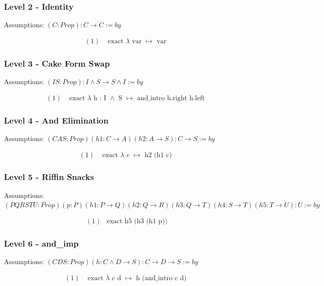 \documentclass{article}
\theoremstyle{theorem}
\theoremstyle{definition}
\theoremstyle{remark}
\begin{document}
\subsubsection*{Level 2 - Identity}
Assumptions: $(C: Prop) : C \rightarrow C := by$

\[
\begin{aligned}
  (1)& \text{ exact } \lambda \text{ var } \mapsto \text{ var }
\end{aligned}
\]

\subsubsection*{Level 3 - Cake Form Swap}
Assumptions: $(I S: Prop) : I \wedge S \rightarrow S \wedge I := by$

\[
\begin{aligned}
  (1)& \text{ exact } \lambda \text{ h : I } \wedge \text{ S } \mapsto \text{ and\_intro h.right h.left }
\end{aligned}
\]

\subsubsection*{Level 4 - And Elimination}
Assumptions: $(C A S: Prop) (h1 : C \rightarrow A) (h2 : A \rightarrow S) : C \rightarrow S := by$

\[
\begin{aligned}
  (1)& \text{ exact } \lambda \text{ c } \mapsto \text{ h2 (h1 c) }
\end{aligned}
\]

\subsubsection*{Level 5 - Riffin Snacks}
Assumptions: $(P Q R S T U: Prop) (p : P) (h1 : P \rightarrow Q) (h2 : Q \rightarrow R) (h3 : Q \rightarrow T) (h4 : S \rightarrow T) (h5 : T \rightarrow U) : U := by$

\[
\begin{aligned}
  (1)& \text{exact h5 (h3 (h1 p))}
\end{aligned}
\]

\subsubsection*{Level 6 - and\_imp}
Assumptions: $(C D S: Prop) (h : C \wedge D \rightarrow S) : C \rightarrow D \rightarrow S := by$

\[
\begin{aligned}
  (1)& \text{ exact } \lambda \text{ c d } \mapsto \text{ h (and\_intro c d) }
\end{aligned}
\]
\end{document}
